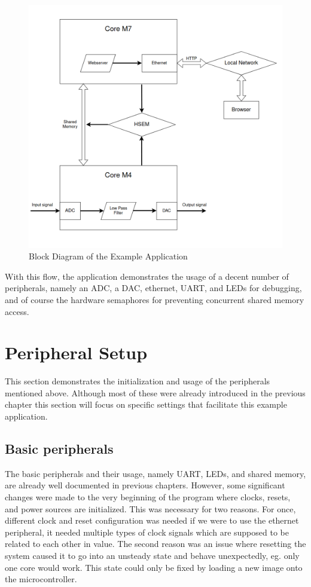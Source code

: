 \begin{figure}[!ht]
    \centering
    \includegraphics[width=150mm, keepaspectratio]{figures/example-app-flowchart.png}
    \caption{Block Diagram of the Example Application}
    \label{fig:app-flowchart}
\end{figure}

With this flow, the application demonstrates the usage of a decent number of peripherals, namely an ADC, a DAC, ethernet, UART, and LEDs for debugging, and of course the hardware semaphores for preventing concurrent shared memory access.

\section{Peripheral Setup}

This section demonstrates the initialization and usage of the peripherals mentioned above. Although most of these were already introduced in the previous chapter this section will focus on specific settings that facilitate this example application.

\subsection{Basic peripherals}

The basic peripherals and their usage, namely UART, LEDs, and shared memory, are already well documented in previous chapters. However, some significant changes were made to the very beginning of the program where clocks, resets, and power sources are initialized. This was necessary for two reasons. For once, different clock and reset configuration was needed if we were to use the ethernet peripheral, it needed multiple types of clock signals which are supposed to be related to each other in value. The second reason was an issue where resetting the system caused it to go into an unsteady state and behave unexpectedly, eg. only one core would work. This state could only be fixed by loading a new image onto the microcontroller.

